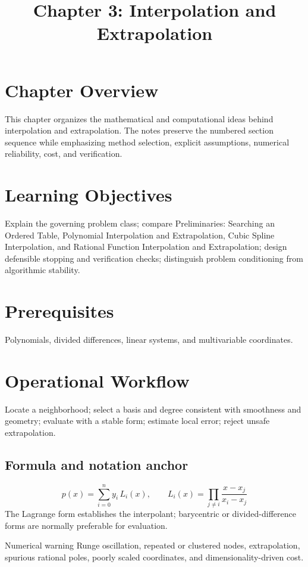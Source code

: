 \documentclass[10pt,letterpaper]{article}
\title{Chapter 3: Interpolation and Extrapolation}
\author{}
\date{}
\begin{document}
\maketitle

\section*{Chapter Overview}
This chapter organizes the mathematical and computational ideas behind interpolation and extrapolation. The notes preserve the numbered section sequence while emphasizing method selection, explicit assumptions, numerical reliability, cost, and verification.

\section*{Learning Objectives}
Explain the governing problem class; compare Preliminaries: Searching an Ordered Table, Polynomial Interpolation and Extrapolation, Cubic Spline Interpolation, and Rational Function Interpolation and Extrapolation; design defensible stopping and verification checks; distinguish problem conditioning from algorithmic stability.

\section*{Prerequisites}
Polynomials, divided differences, linear systems, and multivariable coordinates.

\section*{Operational Workflow}
Locate a neighborhood; select a basis and degree consistent with smoothness and geometry; evaluate with a stable form; estimate local error; reject unsafe extrapolation.

\subsection*{Formula and notation anchor}
\[
p(x)=\sum_{i=0}^{n} y_i\,L_i(x),\qquad L_i(x)=\prod_{j\ne i}\frac{x-x_j}{x_i-x_j}
\]
The Lagrange form establishes the interpolant; barycentric or divided-difference forms are normally preferable for evaluation.

\begin{warnbox}{Numerical warning}
Runge oscillation, repeated or clustered nodes, extrapolation, spurious rational poles, poorly scaled coordinates, and dimensionality-driven cost.
\end{warnbox}
\end{document}
